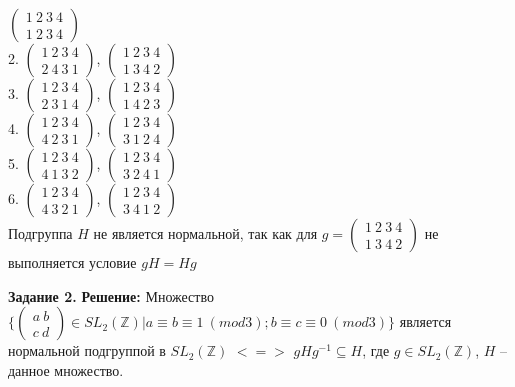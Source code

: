 \documentclass[12pt,a4paper]{scrartcl}
\begin{document}
	$\begin{pmatrix}
	1~2~3~4\\
	1~2~3~4	\end{pmatrix}$ \\
	2. 	$\begin{pmatrix}
	1~2~3~4\\
	2~4~3~1	\end{pmatrix}$, 
	$\begin{pmatrix}
	1~2~3~4\\
	1~3~4~2	\end{pmatrix}$ \\
	3. 	$\begin{pmatrix}
	1~2~3~4\\
	2~3~1~4	\end{pmatrix}$, 
	$\begin{pmatrix}
	1~2~3~4\\
	1~4~2~3	\end{pmatrix}$ \\
	4. 	$\begin{pmatrix}
	1~2~3~4\\
	4~2~3~1	\end{pmatrix}$, 
	$\begin{pmatrix}
	1~2~3~4\\
	3~1~2~4	\end{pmatrix}$ \\
	5. 	$\begin{pmatrix}
	1~2~3~4\\
	4~1~3~2	\end{pmatrix}$, 
	$\begin{pmatrix}
	1~2~3~4\\
	3~2~4~1	\end{pmatrix}$ \\
	6. 	$\begin{pmatrix}
	1~2~3~4\\
	4~3~2~1	\end{pmatrix}$, 
	$\begin{pmatrix}
	1~2~3~4\\
	3~4~1~2	\end{pmatrix}$ \\	
	Подгруппа $H$ не является нормальной, так как для $g = \begin{pmatrix}
	1~2~3~4\\
	1~3~4~2
	\end{pmatrix}
	$ не выполняется условие $gH = Hg$
	\begin{flushright}	
		\textbf{}
	\end{flushright}
	\textbf{Задание 2.} 
	\newline
	\textbf{Решение:} 
	\newline
	\indent
	Множество $\{ \begin{pmatrix}
	a~b\\
	c~d
	\end{pmatrix} \in SL_2(\mathbb{Z}) |  a\equiv b\equiv1~(mod 3); b \equiv c\equiv 0~(mod 3)\}$ является нормальной подгруппой в $SL_2(\mathbb{Z})$ $<=>$ $gHg^{-1} \subseteq H$, где $g \in SL_2(\mathbb{Z})$, $H$ -- данное множество.\\
	
\end{document}
